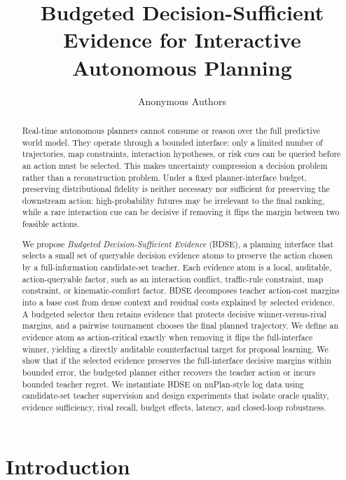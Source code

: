 \documentclass{article}
\title{Budgeted Decision-Sufficient Evidence for Interactive Autonomous Planning}
\author{Anonymous Authors}
\date{}
\begin{document}
\maketitle

\begin{abstract}
Real-time autonomous planners cannot consume or reason over the full predictive world model. They operate through a bounded interface: only a limited number of trajectories, map constraints, interaction hypotheses, or risk cues can be queried before an action must be selected. This makes uncertainty compression a decision problem rather than a reconstruction problem. Under a fixed planner-interface budget, preserving distributional fidelity is neither necessary nor sufficient for preserving the downstream action: high-probability futures may be irrelevant to the final ranking, while a rare interaction cue can be decisive if removing it flips the margin between two feasible actions.

We propose \emph{Budgeted Decision-Sufficient Evidence} (BDSE), a planning interface that selects a small set of queryable decision evidence atoms to preserve the action chosen by a full-information candidate-set teacher. Each evidence atom is a local, auditable, action-queryable factor, such as an interaction conflict, traffic-rule constraint, map constraint, or kinematic-comfort factor. BDSE decomposes teacher action-cost margins into a base cost from dense context and residual costs explained by selected evidence. A budgeted selector then retains evidence that protects decisive winner-versus-rival margins, and a pairwise tournament chooses the final planned trajectory. We define an evidence atom as action-critical exactly when removing it flips the full-interface winner, yielding a directly auditable counterfactual target for proposal learning. We show that if the selected evidence preserves the full-interface decisive margins within bounded error, the budgeted planner either recovers the teacher action or incurs bounded teacher regret. We instantiate BDSE on nuPlan-style log data using candidate-set teacher supervision and design experiments that isolate oracle quality, evidence sufficiency, rival recall, budget effects, latency, and closed-loop robustness.
\end{abstract}

\section{Introduction}
\end{document}
